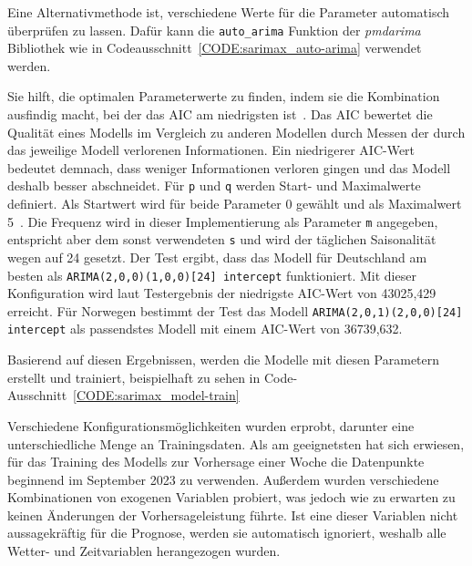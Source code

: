 Eine Alternativmethode ist, verschiedene Werte für die Parameter automatisch überprüfen zu lassen.
Dafür kann die \lstinline[columns=fixed]{auto_arima} Funktion der \textit{pmdarima} Bibliothek wie in Codeausschnitt~\ref{CODE:sarimax_auto-arima} verwendet werden.

Sie hilft, die optimalen Parameterwerte zu finden, indem sie die Kombination ausfindig macht, bei der das \ac{AIC} am niedrigsten ist~\cite{Rahmadhan.8.5.2023}.
Das \ac{AIC} bewertet die Qualität eines Modells im Vergleich zu anderen Modellen durch Messen der durch das jeweilige Modell verlorenen Informationen.
Ein niedrigerer \ac{AIC}-Wert bedeutet demnach, dass weniger Informationen verloren gingen und das Modell deshalb besser abschneidet.
Für \lstinline[columns=fixed]{p} und \lstinline[columns=fixed]{q} werden Start- und Maximalwerte definiert.
Als Startwert wird für beide Parameter 0 gewählt und als Maximalwert 5~\cite{Peixeiro.2022}.
Die Frequenz wird in dieser Implementierung als Parameter \lstinline[columns=fixed]{m} angegeben, entspricht aber dem sonst verwendeten \lstinline[columns=fixed]{s} und wird der täglichen Saisonalität wegen auf 24 gesetzt.
Der Test ergibt, dass das Modell für Deutschland am besten als \lstinline[columns=fixed]{ARIMA(2,0,0)(1,0,0)[24] intercept} funktioniert.
Mit dieser Konfiguration wird laut Testergebnis der niedrigste \ac{AIC}-Wert von 43025,429 erreicht.
Für Norwegen bestimmt der Test das Modell \lstinline[columns=fixed]{ARIMA(2,0,1)(2,0,0)[24] intercept} als passendstes Modell mit einem \ac{AIC}-Wert von 36739,632.

Basierend auf diesen Ergebnissen, werden die Modelle mit diesen Parametern erstellt und trainiert, beispielhaft zu sehen in Code-Ausschnitt~\ref{CODE:sarimax_model-train}


Verschiedene Konfigurationsmöglichkeiten wurden erprobt, darunter eine unterschiedliche Menge an Trainingsdaten.
Als am geeignetsten hat sich erwiesen, für das Training des Modells zur Vorhersage einer Woche die Datenpunkte beginnend im September 2023 zu verwenden.
Außerdem wurden verschiedene Kombinationen von exogenen Variablen probiert, was jedoch wie zu erwarten zu keinen Änderungen der Vorhersageleistung führte.
Ist eine dieser Variablen nicht aussagekräftig für die Prognose, werden sie automatisch ignoriert, weshalb alle Wetter- und Zeitvariablen herangezogen wurden.

